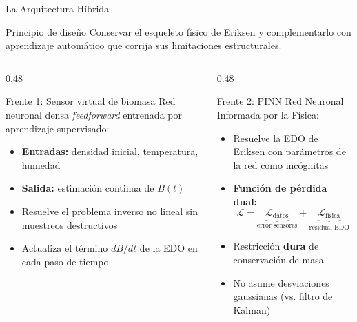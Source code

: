 \documentclass[aspectratio=169, 11pt]{beamer}
\begin{document}
\begin{frame}{La Arquitectura Híbrida}
\begin{alertblock}{Principio de diseño}
Conservar el esqueleto físico de Eriksen y complementarlo con aprendizaje automático que corrija sus limitaciones estructurales.
\end{alertblock}
\vspace{0.2cm}
\begin{columns}[T]
\begin{column}{0.48\textwidth}
\begin{block}{Frente 1: Sensor virtual de biomasa}
Red neuronal densa \textit{feedforward} entrenada por aprendizaje supervisado:
\begin{itemize}
    \item \textbf{Entradas:} densidad inicial, temperatura, humedad
    \item \textbf{Salida:} estimación continua de $B(t)$
    \item Resuelve el problema inverso no lineal sin muestreos destructivos
    \item Actualiza el término $dB/dt$ de la EDO en cada paso de tiempo
\end{itemize}
\end{block}
\end{column}
\begin{column}{0.48\textwidth}
\begin{block}{Frente 2: PINN}
Red Neuronal Informada por la Física:
\begin{itemize}
    \item Resuelve la EDO de Eriksen con parámetros de la red como incógnitas
    \item \textbf{Función de pérdida dual:}
        \begin{equation*}
        \mathcal{L} = \underbrace{\mathcal{L}_{\text{datos}}}_{\text{error sensores}} + \underbrace{\mathcal{L}_{\text{f\'{i}sica}}}_{\text{residual EDO}}
        \end{equation*}
    \item Restricción \textbf{dura} de conservación de masa
    \item No asume desviaciones gaussianas (vs. filtro de Kalman)
\end{itemize}
\end{block}
\end{column}
\end{columns}
\end{frame}
\end{document}
